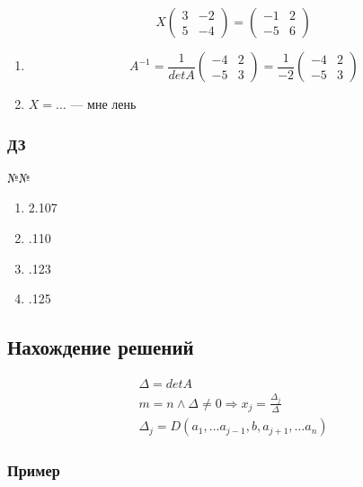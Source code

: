 \documentclass{article}
\begin{document}
\[
X \begin{pmatrix}
	3 & -2 \\
	5 & -4
\end{pmatrix} =
\begin{pmatrix}
	-1 & 2 \\
	-5 & 6
\end{pmatrix}
\]

\begin{enumerate}
	\item \[
	A^{-1} = \frac{1}{det A} \begin{pmatrix}
		-4 & 2 \\
		-5 & 3
	\end{pmatrix} =
	\frac{1}{-2} \begin{pmatrix}
		-4 & 2 \\
		-5 & 3
	\end{pmatrix}
	\]
	\item $X = \dots$ --- мне лень
\end{enumerate}

\subsubsection{ДЗ}

№№
\begin{enumerate}
	\item 2.107
	\item .110
	\item .123
	\item .125
\end{enumerate}

\subsection{Нахождение решений}

\begin{gather*}
	\Delta = det A \\
	m = n \land \Delta \ne 0 \Rightarrow x_j = \frac{\Delta_j}{\Delta} \\
	\Delta_j = D(a_1, \dots a_{j-1}, b, a_{j+1}, \dots a_n)
\end{gather*}

\subsubsection*{Пример}
\end{document}
